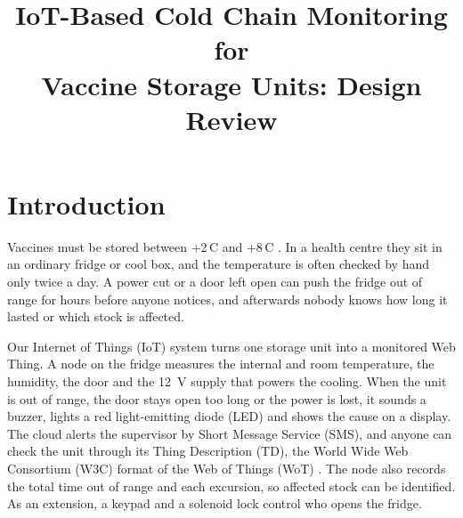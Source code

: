 \documentclass[conference,12pt]{IEEEtran}
\newif\ifnotes \notesfalse
\newcommand{\note}[1]{\ifnotes%
  \par\medskip
  {\leftskip=1.2em\rightskip=1.2em\small\itshape\color{noteRed}#1\par}%
  \medskip\fi}
\newcommand{\degC}{\,\textdegree{}C}
\begin{document}
\title{IoT-Based Cold Chain Monitoring for\\ Vaccine Storage Units: Design Review}

\author{
}

\maketitle

\note{Before you submit: (1) check the PDF is 5 pages or fewer and the last page's columns are
balanced; (2) check every status in Table~II is true today; (3) put your breadboard photo in
Fig.~5; (4) delete all red notes.}

\section{Introduction}

Vaccines must be stored between +2\degC{} and +8\degC{} \cite{who2006}. In a health centre they
sit in an ordinary fridge or cool box, and the temperature is often checked by hand only twice a
day. A power cut or a door left open can push the fridge out of range for hours before anyone
notices, and afterwards nobody knows how long it lasted or which stock is affected.

Our Internet of Things (IoT) system turns one storage unit into a monitored Web Thing. A node on
the fridge measures the internal and room temperature, the humidity, the door and the 12~V supply
that powers the cooling. When the unit is out of range, the door stays open too long or the power
is lost, it sounds a buzzer, lights a red light-emitting diode (LED) and shows the cause on a
display. The cloud alerts the supervisor by Short Message Service (SMS), and anyone can check the
unit through its Thing Description (TD), the World Wide Web Consortium (W3C) format of the Web of
Things (WoT) \cite{wot-td}. The node also records the total time out of range and each excursion,
so affected stock can be identified. As an extension, a keypad and a solenoid lock control who
opens the fridge.
\end{document}
